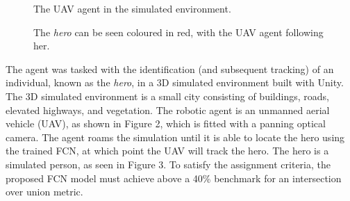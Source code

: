 \documentclass[a4paper]{article}
\begin{document}
\begin{figure}[h]
\begin{minipage}{0.45\textwidth}
\centering
{}
\caption{The UAV agent in the simulated environment.}
\end{minipage}
\hspace{1cm}
\begin{minipage}{0.45\textwidth}
\centering
{}
\caption{The \textit{hero} can be seen coloured in red, with the UAV agent following her.}
\end{minipage}
\end{figure}

The agent was tasked with the identification (and subsequent tracking) of an individual, known as the \textit{hero}, in a 3D simulated environment built with Unity. The 3D simulated environment is a small city consisting of buildings, roads, elevated highways, and vegetation. The robotic agent is an unmanned aerial vehicle (UAV), as shown in Figure 2, which is fitted with a panning optical camera. The agent roams the simulation until it is able to locate the hero using the trained FCN, at which point the UAV will track the hero. The hero is a simulated person, as seen in Figure 3. To satisfy the assignment criteria, the proposed FCN model must achieve above a 40\% benchmark for an intersection over union metric. 
\end{document}

